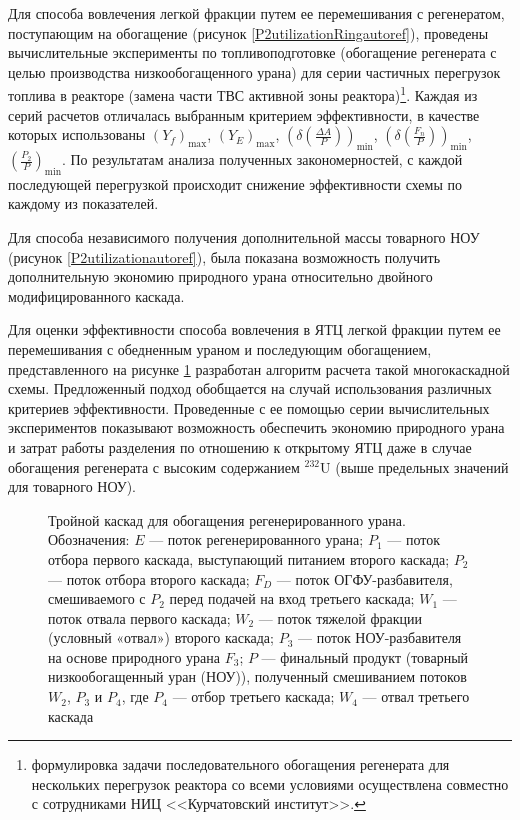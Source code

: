 Для способа вовлечения легкой фракции путем ее перемешивания с регенератом, поступающим на обогащение (рисунок \ref{P2utilizationRingautoref}), проведены вычислительные эксперименты по топливоподготовке (обогащение регенерата с целью производства низкообогащенного урана) для серии частичных перегрузок топлива в реакторе (замена части ТВС активной зоны реактора)\footnote{формулировка задачи последовательного обогащения регенерата для нескольких перегрузок реактора со всеми условиями осуществлена совместно с сотрудниками НИЦ <<Курчатовский институт>>.}. Каждая из серий расчетов отличалась выбранным критерием эффективности, в качестве которых использованы $(Y_f)_\text{max}$, $(Y_{E})_\text{max}$, $(\delta(\frac{\Delta A}{P}))_\text{min}$, $(\delta(\frac{F_n}{P}))_\text{min}$, $(\frac{P_2}{P})_\text{min}$. По результатам анализа полученных закономерностей, с каждой последующей перегрузкой происходит снижение эффективности схемы по каждому из показателей.

Для способа независимого получения дополнительной массы товарного НОУ (рисунок \ref{P2utilizationautoref}), была показана возможность получить дополнительную экономию природного урана относительно двойного модифицированного каскада.

Для оценки эффективности способа вовлечения в ЯТЦ легкой фракции путем ее перемешивания с обедненным ураном и последующим обогащением, представленного на рисунке \ref{p2_withDepU} разработан алгоритм расчета такой многокаскадной схемы. Предложенный подход обобщается на случай использования различных критериев эффективности. Проведенные с ее помощью серии вычислительных экспериментов показывают возможность обеспечить экономию природного урана и затрат работы разделения по отношению к открытому ЯТЦ даже в случае обогащения регенерата с высоким содержанием $^{232}$U (выше предельных значений для товарного НОУ).

\begin{figure}[ht]
  \caption{Тройной каскад для обогащения регенерированного урана. Обозначения: $E$ --- поток регенерированного урана; $P_1$ --- поток отбора первого каскада, выступающий питанием второго каскада; $P_2$ --- поток отбора второго каскада; $F_{D}$ --- поток ОГФУ-разбавителя, смешиваемого с $P_2$ перед подачей на вход третьего каскада; $W_1$ --- поток отвала первого каскада; $W_2$ --- поток тяжелой фракции (условный «отвал») второго каскада; $P_3$ --- поток НОУ-разбавителя на основе природного урана $F_3$; $P$ --- финальный продукт (товарный низкообогащенный уран (НОУ)), полученный смешиванием потоков $W_2$, $P_3$ и $P_4$, где $P_4$ --- отбор третьего каскада; $W_4$ --- отвал третьего каскада}\label{p2_withDepU}
\end{figure}


